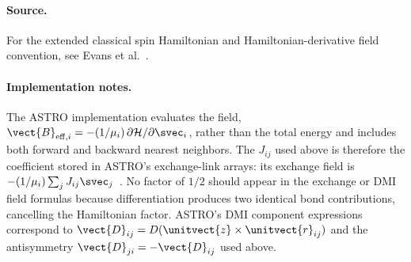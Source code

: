 \paragraph{Source.}
For the extended classical spin Hamiltonian and Hamiltonian-derivative field
convention, see Evans et al.~\cite{evans2014atomistic}.

\paragraph{Implementation notes.}
The ASTRO implementation evaluates the field,
$\vect{B}_{\mathrm{eff},i}=-(1/\mu_i)\,\partial\mathcal{H}/\partial\svec_i$,
rather than the total energy and includes both forward and backward nearest
neighbors.  The $J_{ij}$ used above is therefore the coefficient stored in
ASTRO's exchange-link arrays: its exchange field is
$-(1/\mu_i)\sum_jJ_{ij}\svec_j$~\cite{astro-code}.  No factor of $1/2$ should
appear in the exchange or DMI field formulas because differentiation produces
two identical bond contributions, cancelling the Hamiltonian factor.  ASTRO's
DMI component expressions correspond to
$\vect{D}_{ij}=D(\unitvect{z}\times\unitvect{r}_{ij})$ and the antisymmetry
$\vect{D}_{ji}=-\vect{D}_{ij}$ used above.
